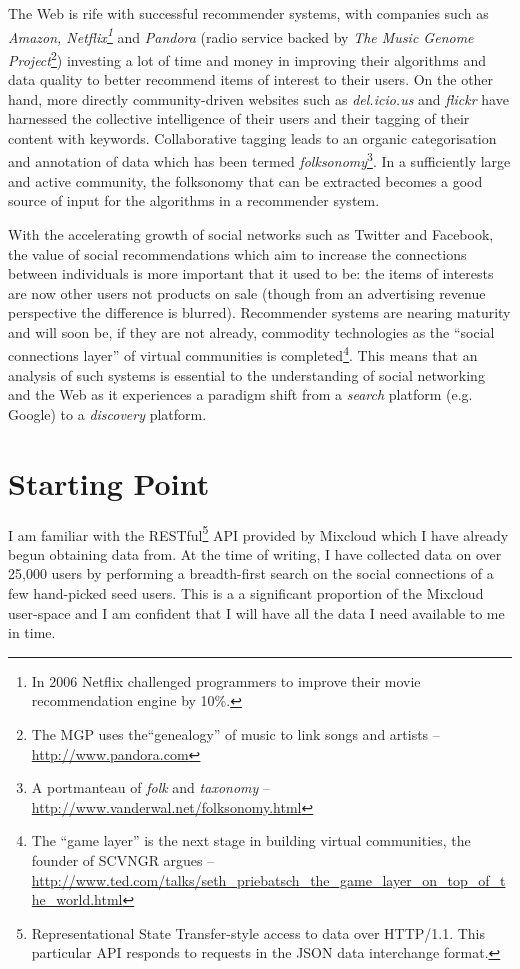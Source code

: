 The Web is rife with successful recommender systems, with companies such as 
\textit{Amazon, Netflix\footnote{In 2006 Netflix challenged programmers to 
improve their movie recommendation engine by 10\%.}} and \textit{Pandora} 
(radio service backed by \textit{The Music Genome Project}\footnote{The MGP 
uses the``genealogy'' of music to link songs and artists -- 
\url{http://www.pandora.com}}) investing a lot of time and money in improving 
their algorithms and data quality to better recommend items of interest to 
their users. On the other hand, more directly community-driven websites such as 
\textit{del.icio.us} and \textit{flickr} have harnessed the collective 
intelligence of their users and their tagging of their content with keywords. 
Collaborative tagging leads to an organic categorisation and annotation of data 
which has been termed \textit{folksonomy}\footnote{A portmanteau of 
\textit{folk} and \textit{taxonomy} -- 
\url{http://www.vanderwal.net/folksonomy.html}}. In a sufficiently large and 
active community, the folksonomy that can be extracted becomes a good source of 
input for the algorithms in a recommender system. 

With the accelerating growth of social networks such as Twitter and Facebook, 
the value of social recommendations which aim to increase the connections 
between individuals is more important that it used to be: the items of 
interests are now other users not products on sale (though from an advertising 
revenue perspective the difference is blurred). Recommender systems are nearing 
maturity and will soon be, if they are not already, commodity technologies as 
the ``social connections layer'' of virtual communities is completed\footnote{
The ``game layer'' is the next stage in building virtual communities, the 
founder of SCVNGR argues -- \url{
http://www.ted.com/talks/seth_priebatsch_the_game_layer_on_top_of_the_world.html}}. 
This means that an analysis of such systems is essential to the understanding 
of social networking and the Web as it experiences a paradigm shift from a 
\emph{search} platform (e.g. Google) to a \emph{discovery} platform.

\section{Starting Point}

I am familiar with the RESTful\footnote{Representational State Transfer-style 
access to data over HTTP/1.1. This particular API responds to requests in the 
JSON data interchange format.} API provided by Mixcloud which I have already 
begun obtaining data from. At the time of writing, I have collected data on 
over 25,000 users by performing a breadth-first search on the social 
connections of a few hand-picked seed users. This is a a significant proportion 
of the Mixcloud user-space and I am confident that I will have all the data I 
need available to me in time.

